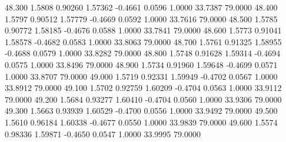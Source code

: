   48.300   1.5808   0.90260   1.57362  -0.4661   0.0596   1.0000  33.7387  79.0000
  48.400   1.5797   0.90512   1.57779  -0.4669   0.0592   1.0000  33.7616  79.0000
  48.500   1.5785   0.90772   1.58185  -0.4676   0.0588   1.0000  33.7841  79.0000
  48.600   1.5773   0.91041   1.58578  -0.4682   0.0583   1.0000  33.8063  79.0000
  48.700   1.5761   0.91325   1.58955  -0.4688   0.0579   1.0000  33.8282  79.0000
  48.800   1.5748   0.91628   1.59314  -0.4694   0.0575   1.0000  33.8496  79.0000
  48.900   1.5734   0.91960   1.59648  -0.4699   0.0571   1.0000  33.8707  79.0000
  49.000   1.5719   0.92331   1.59949  -0.4702   0.0567   1.0000  33.8912  79.0000
  49.100   1.5702   0.92759   1.60209  -0.4704   0.0563   1.0000  33.9112  79.0000
  49.200   1.5684   0.93277   1.60410  -0.4704   0.0560   1.0000  33.9306  79.0000
  49.300   1.5663   0.93939   1.60529  -0.4700   0.0556   1.0000  33.9492  79.0000
  49.500   1.5610   0.96184   1.60338  -0.4677   0.0550   1.0000  33.9839  79.0000
  49.600   1.5574   0.98336   1.59871  -0.4650   0.0547   1.0000  33.9995  79.0000
